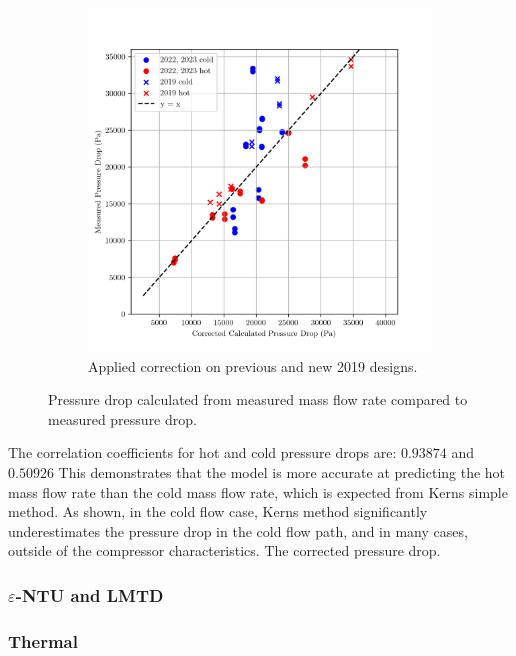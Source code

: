 \documentclass{article}
\begin{document}
\begin{figure}[H]
\begin{subfigure}{.49\textwidth}
    \includegraphics[width=.99\linewidth]{dp_ccalc_vs_meas.png}
    \caption{Applied correction on previous and new 2019 designs.}
    \label{fig:corrected_pressure_drops}
  \end{subfigure}
    
  \caption{Pressure drop calculated from measured mass flow rate compared to measured pressure drop.}
  \label{fig:pressure_drops}

\end{figure}

The correlation coefficients for hot and cold pressure drops are:  $\mathbf{0.93874}$ and $\mathbf{0.50926}$
This demonstrates that the model is more accurate at predicting the hot mass flow rate than the cold mass flow rate,
which is expected from Kerns simple method.
As shown, in the cold flow case, Kerns method significantly underestimates the pressure drop in the cold flow path, and in many cases, outside of the compressor characteristics.
The corrected pressure drop.

\subsubsection{$\varepsilon$-NTU and LMTD}

\subsubsection{Thermal}
\end{document}
